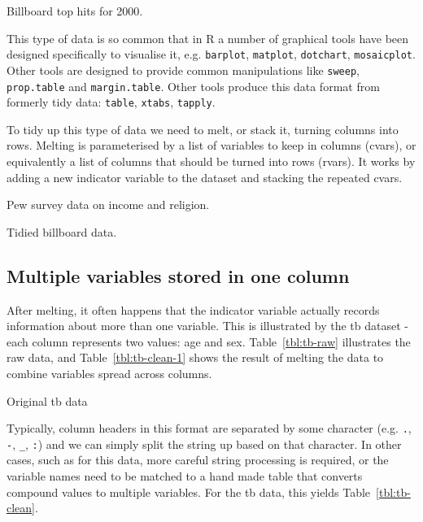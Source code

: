 \documentclass[oneside]{article}
\begin{document}
\begin{table}[htbp]
  \centering
  
  \caption{Billboard top hits for 2000.}
  \label{tbl:billboard-raw}
\end{table}

This type of data is so common that in R a number of graphical tools have been designed specifically to visualise it, e.g. {\tt barplot}, {\tt matplot}, {\tt dotchart}, {\tt mosaicplot}. Other tools are designed to provide common manipulations like {\tt sweep}, {\tt prop.table} and {\tt margin.table}. Other tools produce this data format from formerly tidy data: {\tt table}, {\tt xtabs}, {\tt tapply}.

To tidy up this type of data we need to melt, or stack it, turning columns into rows. Melting is parameterised by a list of variables to keep in columns (cvars), or equivalently a list of columns that should be turned into rows (rvars). It works by adding a new indicator variable to the dataset and stacking the repeated cvars.

\begin{table}[htbp]
  \centering
  
  \caption{Pew survey data on income and religion.}
  \label{tbl:pew-clean}
\end{table}

\begin{table}[htbp]
  \centering
  
  \caption{Tidied billboard data.}
  \label{tbl:billboard-clean}
\end{table}


\subsection{Multiple variables stored in one column}

After melting, it often happens that the indicator variable actually records information about more than one variable. This is illustrated by the tb dataset - each column represents two values: age and sex.  Table~\ref{tbl:tb-raw} illustrates the raw data, and Table~\ref{tbl:tb-clean-1} shows the result of melting the data to combine variables spread across columns.

\begin{table}[htbp]
  \centering
  
  \caption{Original tb data}
  \label{tbl:tb-raw}
\end{table}

Typically, column headers in this format are separated by some character (e.g. {\tt .}, {\tt -}, {\tt \_}, {\tt :}) and we can simply split the string up based on that character.  In other cases, such as for this data, more careful string processing is required, or the variable names need to be matched to a hand made table that converts compound values to multiple variables. For the tb data, this yields Table~\ref{tbl:tb-clean}.
\end{document}
